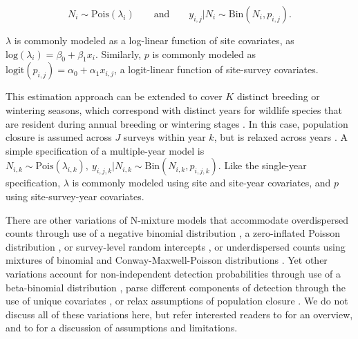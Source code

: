 \documentclass[codesnippet]{jss}
\begin{document}
$$N_i \sim \text{Pois}(\lambda_i) \qquad \text{and} \qquad  y_{i,j} | N_i \sim \text{Bin}(N_i, p_{i,j}).$$

$\lambda$ is commonly modeled as a log-linear function of site covariates, as $\text{log}(\lambda_i) = \beta_0 + \beta_1 x_i$. Similarly, $p$ is commonly modeled as $\text{logit}(p_{i,j}) = \alpha_0 + \alpha_1 x_{i,j}$, a logit-linear function of site-survey covariates.

This estimation approach can be extended to cover $K$ distinct breeding or wintering seasons, which correspond with distinct years for wildlife species that are resident during annual breeding or wintering stages  \citep{Kery_Dorazio_Soldaat_Van_Strien_Zuiderwijk_Royle_2009}. In this case, population closure is assumed across $J$ surveys within year $k$, but is relaxed across years \citep{Kery_Dorazio_Soldaat_Van_Strien_Zuiderwijk_Royle_2009}. A simple specification of a multiple-year model is $N_{i,k} \sim \text{Pois}(\lambda_{i,k}), \ y_{i,j,k} | N_{i,k} \sim \text{Bin}(N_{i,k}, p_{i,j,k})$. Like the single-year specification, $\lambda$ is commonly modeled using site and site-year covariates, and $p$ using site-survey-year covariates. 

There are other variations of N-mixture models that accommodate overdispersed counts through use of a negative binomial distribution \citep{Kery_Royle_2010}, a zero-inflated Poisson distribution \citep{Wenger_Freeman_2008}, or survey-level random intercepts \citep{Kery_Schaub_2011}, or underdispersed counts using mixtures of binomial and Conway-Maxwell-Poisson distributions  \citep{wu2015bayesian}. Yet other variations account for non-independent detection probabilities through use of a beta-binomial distribution  \citep{Martin_Royle_Mackenzie_Edwards_Kery_Gardner_2011}, parse different components of detection through the use of unique covariates  \citep{O'Donnell_Thompson_III_Semlitsch_2015}, or relax assumptions of population closure  \citep{Chandler_Royle_King_2011, Dail_Madsen_2011}. We do not discuss all of these variations here, but refer interested readers to \cite{Denes_Silveira_Beissinger_2015} for an overview, and to  \cite{Barker_Schofield_Link_Sauer_et_al_2017} for a discussion of assumptions and limitations.
\end{document}
